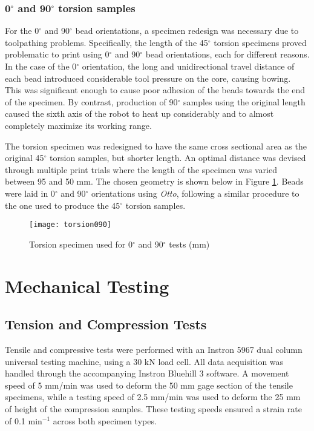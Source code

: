 \documentclass[main.tex]{subfiles}
\begin{document}
\subsubsection{0$^\circ$ and 90$^\circ$ torsion samples}
For the 0$^\circ$ and 90$^\circ$ bead orientations, a specimen redesign was necessary due to toolpathing problems. Specifically, the length of the 45$^\circ$ torsion specimens proved problematic to print using 0$^\circ$ and 90$^\circ$ bead orientations, each for different reasons. In the case of the 0$^\circ$ orientation, the long and unidirectional travel distance of each bead introduced considerable tool pressure on the core, causing bowing. This was significant enough to cause poor adhesion of the beads towards the end of the specimen. By contrast, production of 90$^\circ$ samples using the original length caused the sixth axis of the robot to heat up considerably and to almost completely maximize its working range. 

The torsion specimen was redesigned to have the same cross sectional area as the original 45$^\circ$ torsion samples, but shorter length. An optimal distance was devised through multiple print trials where the length of the specimen was varied between 95 and 50 mm. The chosen geometry is shown below in Figure \ref{fig:tors090}. Beads were laid in 0$^\circ$ and 90$^\circ$ orientations using \emph{Otto}, following a similar procedure to the one used to produce the 45$^\circ$ torsion samples.

\begin{figure}[h]
	\center
	\texttt{[image: torsion090]}
	\caption{Torsion specimen used for 0$^\circ$ and 90$^\circ$ tests (mm)} \label{fig:tors090}
\end{figure}

\section{Mechanical Testing}

\subsection{Tension and Compression Tests}
Tensile and compressive tests were performed with an Instron 5967 dual column universal testing machine, using a 30 kN load cell. All data acquisition was handled through the accompanying Instron Bluehill 3 software. A movement speed of 5 mm/min was used to deform the 50 mm gage section of the tensile specimens, while a testing speed of 2.5 mm/min was used to deform the 25 mm of height of the compression samples. These testing speeds ensured a strain rate of 0.1 min$^{-1}$ across both specimen types.
\end{document}
